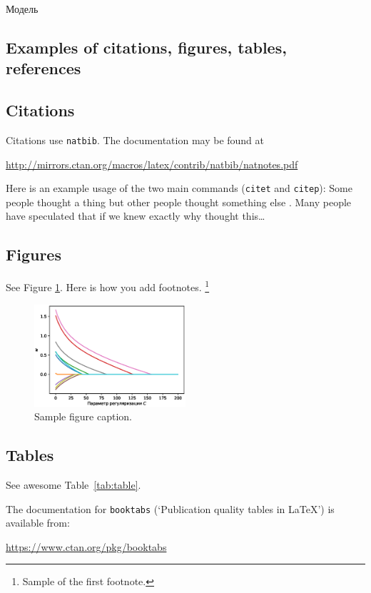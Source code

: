 \documentclass{article}
\begin{document}
\begin{section}{Модель}
\section{Examples of citations, figures, tables, references}
\label{sec:others}

\subsection{Citations}
Citations use \verb+natbib+. The documentation may be found at
\begin{center}
	\url{http://mirrors.ctan.org/macros/latex/contrib/natbib/natnotes.pdf}
\end{center}

Here is an example usage of the two main commands (\verb+citet+ and \verb+citep+): Some people thought a thing \citep{kour2014real, hadash2018estimate} but other people thought something else \citep{kour2014fast}. Many people have speculated that if we knew exactly why \citet{kour2014fast} thought this\dots

\subsection{Figures}
\lipsum[10]
See Figure \ref{fig:fig1}. Here is how you add footnotes. \footnote{Sample of the first footnote.}
\lipsum[11]

\begin{figure}
	\centering
	\includegraphics[width=0.5\textwidth]{../figures/log_reg_cs_exp.eps}
	\caption{Sample figure caption.}
	\label{fig:fig1}
\end{figure}

\subsection{Tables}
See awesome Table~\ref{tab:table}.

The documentation for \verb+booktabs+ (`Publication quality tables in LaTeX') is available from:
\begin{center}
	\url{https://www.ctan.org/pkg/booktabs}
\end{center}



\end{section}
\end{document}
